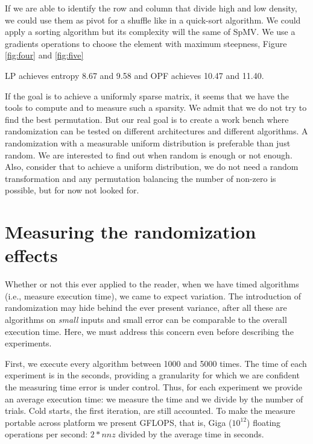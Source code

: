 \documentclass[manuscript,screen]{acmart}
\begin{document}
If we are able to identify the row and column that divide high and low
density, we could use them as pivot for a shuffle like in a quick-sort
algorithm. We could apply a sorting algorithm but its complexity will
the same of SpMV. We use a gradients operations to choose the element
with maximum steepness, Figure \ref{fig:four} and \ref{fig:five}

LP achieves entropy 8.67 and 9.58 and OPF achieves 10.47 and 11.40.



If the goal is to achieve a uniformly sparse matrix, it seems that we
have the tools to compute and to measure such a sparsity. We admit
that we do not try to find the best permutation. But our real goal is
to create a work bench where randomization can be tested on different
architectures and different algorithms. A randomization with a
measurable uniform distribution is preferable than just random. We are
interested to find out when random is enough or not enough. Also,
consider that to achieve a uniform distribution, we do not need a
random transformation and any permutation balancing the number of
non-zero is possible, but for now not looked for.

\section{Measuring the randomization effects}
\label{sec:measuring}

Whether or not this ever applied to the reader, when we have timed
algorithms (i.e., measure execution time), we came to expect
variation.  The introduction of randomization may hide behind the ever
present variance, after all these are algorithms on {\em small} inputs
and small error can be comparable to the overall execution time. Here,
we must address this concern even before describing the experiments.

First, we execute every algorithm between 1000 and 5000 times. The
time of each experiment is in the seconds, providing a granularity for
which we are confident the measuring time error is under
control. Thus, for each experiment we provide an average execution
time: we measure the time and we divide by the number of trials. Cold
starts, the first iteration, are still accounted. To make the measure
portable across platform we present GFLOPS, that is, Giga ($10^{12}$)
floating operations per second: $2*nnz$ divided by the average time in
seconds.
\end{document}
